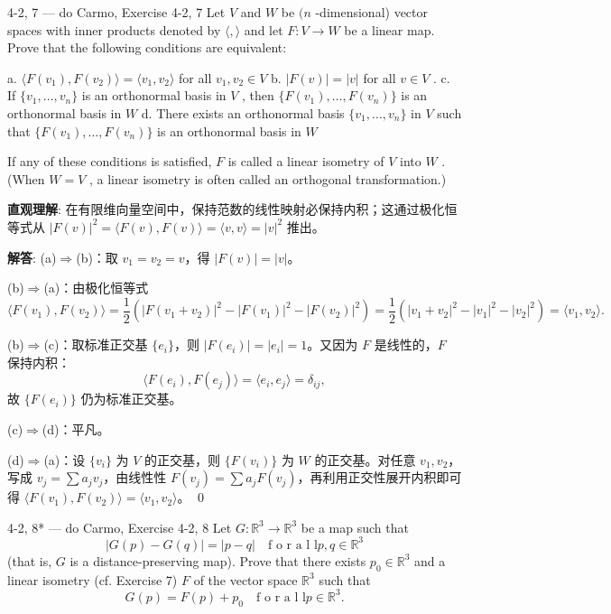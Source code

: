 \begin{exercise}{4-2, 7 — do Carmo, Exercise 4-2, 7}
Let $V$ and $W$ be $(n$ -dimensional) vector spaces with inner products denoted by $\langle , \rangle$ and let $F \colon V \to W$ be a linear map. Prove that the following conditions are equivalent:

a. $\langle F(v_1),F(v_2)\rangle = \langle v_1,v_2\rangle$ for all $v_{1},v_{2}\in V$
b. $|F(v)| = |v|$ for all $v \in V$ .
c. If $\{v_{1},\ldots ,v_{n}\}$ is an orthonormal basis in $V$ , then $\{F(v_1),\dots ,F(v_n)\}$ is an orthonormal basis in $W$
d. There exists an orthonormal basis $\{v_{1},\ldots ,v_{n}\}$ in $V$ such that $\{F(v_1),\dots ,F(v_n)\}$ is an orthonormal basis in $W$

If any of these conditions is satisfied, $F$ is called a linear isometry of $V$ into $W$ . (When $W = V$ , a linear isometry is often called an orthogonal transformation.)
\end{exercise}

\begin{solution}
\textbf{直观理解}: 在有限维向量空间中，保持范数的线性映射必保持内积；这通过极化恒等式从 $|F(v)|^2 = \langle F(v),F(v)\rangle = \langle v,v\rangle = |v|^2$ 推出。

\textbf{解答}: (a)$\Rightarrow$(b)：取 $v_1=v_2=v$，得 $|F(v)| = |v|$。

(b)$\Rightarrow$(a)：由极化恒等式
\[
\langle F(v_1),F(v_2)\rangle = \frac{1}{2}\left(|F(v_1+v_2)|^2 - |F(v_1)|^2 - |F(v_2)|^2\right) = \frac{1}{2}\left(|v_1+v_2|^2 - |v_1|^2 - |v_2|^2\right) = \langle v_1,v_2\rangle.
\]

(b)$\Rightarrow$(c)：取标准正交基 $\{e_i\}$，则 $|F(e_i)|=|e_i|=1$。又因为 $F$ 是线性的，$F$ 保持内积：
\[
\langle F(e_i),F(e_j)\rangle = \langle e_i,e_j\rangle = \delta_{ij},
\]
故 $\{F(e_i)\}$ 仍为标准正交基。

(c)$\Rightarrow$(d)：平凡。

(d)$\Rightarrow$(a)：设 $\{v_i\}$ 为 $V$ 的正交基，则 $\{F(v_i)\}$ 为 $W$ 的正交基。对任意 $v_1,v_2$，写成 $v_j = \sum a_j v_j$，由线性性 $F(v_j) = \sum a_j F(v_j)$，再利用正交性展开内积即可得 $\langle F(v_1),F(v_2)\rangle = \langle v_1,v_2\rangle$。
\qed
\end{solution}

\begin{exercise}{4-2, 8* — do Carmo, Exercise 4-2, 8}
Let $G \colon \mathbb{R}^3 \to \mathbb{R}^3$ be a map such that
\[
| G (p) - G (q) | = | p - q | \quad \text {f o r a l l} p, q \in \mathbb{R} ^ {3}
\]
(that is, $G$ is a distance-preserving map). Prove that there exists $p_0 \in \mathbb{R}^3$ and a linear isometry (cf. Exercise 7) $F$ of the vector space $\mathbb{R}^3$ such that
\[
G (p) = F (p) + p _ {0} \quad \text {f o r a l l} p \in \mathbb{R} ^ {3}.
\]
\end{exercise}

